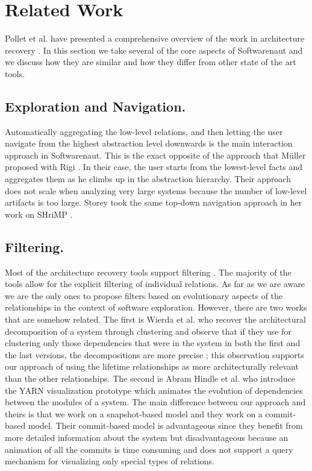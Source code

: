 \documentclass[preprint,12pt]{elsarticle}
\begin{document}
\newpage
\section {Related Work}
\label {sec:rel}

Pollet et al. have presented a comprehensive overview of the work in architecture recovery \cite{pollet-sar}. In this section we take several of the core aspects of Softwarenaut and we discuss how they are similar and how they differ from other state of the art tools.

\subsection {Exploration and Navigation.} Automatically aggregating the low-level relations, and then letting the user navigate from the highest abstraction level downwards is the main interaction approach in Softwarenaut. This is the exact opposite of the approach that M{\"u}ller proposed with Rigi \cite{muller-revengenv}. In their case, the user starts from the lowest-level facts and aggregates them as he climbs up in the abstraction hierarchy. Their approach does not scale when analyzing very large systems because the number of low-level artifacts is too large. Storey took the same top-down navigation approach in her work on SHriMP \cite{storey-shrimp}.

\subsection {Filtering.} Most of the architecture recovery tools support filtering \cite{aracic-filtering}. The majority of the tools allow for the explicit filtering of individual relations. As far as we are aware we are the only ones to propose filters based on evolutionary aspects of the relationships in the context of software exploration. However, there are two works that are somehow related. The first is Wierda et al. who recover the architectural decomposition of a system through clustering and observe that if they use for clustering only those dependencies that were in the system in both the first and the last versions, the decompositions are more precise \cite{wierda-clustering}; this observation supports our approach of using the lifetime relationships as more architecturally relevant than the other relationships. The second is Abram Hindle et al. \cite{hindle-yarn} who introduce the YARN visualization prototype which animates the evolution of dependencies between the modules of a system. The main difference between our approach and theirs is that we work on a snapshot-based model and they work on a commit-based model. Their commit-based model is advantageous since they benefit from more detailed information about the system but disadvantageous because an animation of all the commits is time consuming and does not support a query mechanism for visualizing only special types of relations.
\end{document}
